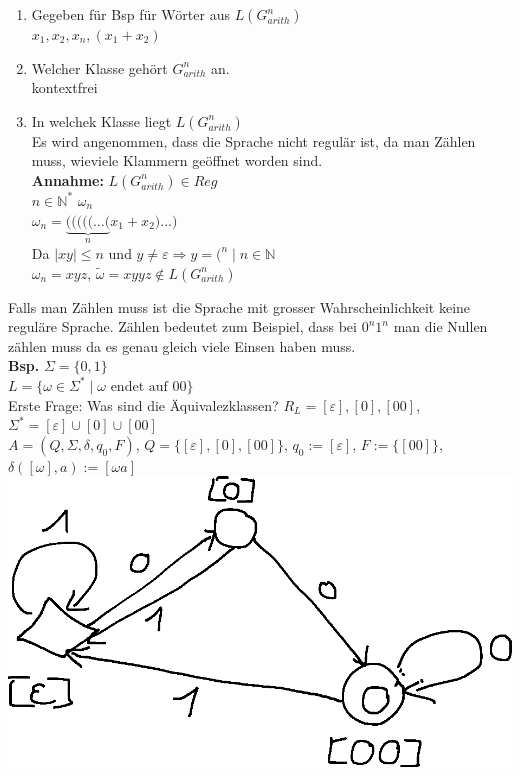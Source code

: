 \documentclass[10pt]{article}
\newcommand{\NN}{\mathbb{N}} %
\newcommand{\Bold}[1]{\textbf{#1}} %
\newcommand{\T}[1]{\text{#1}} %
\newcommand{\Ra}{\Rightarrow}
\begin{document}
\begin{enumerate}
 \item Gegeben f\"ur Bsp f\"ur W\"orter aus $L(G^n_{arith})$\\
 $x_1,x_2,x_n,(x_1+x_2)$
 \item Welcher Klasse geh\"ort $G^n_{arith}$ an.\\
 kontextfrei
 \item In welchek Klasse liegt $L(G^n_{arith})$\\
 Es wird angenommen, dass die Sprache nicht regul\"ar ist, da man Z\"ahlen muss, wieviele Klammern ge\"offnet worden sind.\\
 \Bold{Annahme:} $L(G^n_{arith})\in Reg$\\
 $n\in \NN^*$ $\omega_n$\\
 $\omega_n = \underbrace{(((((\dots(}_nx_1+x_2)\dots)$\\
 Da $\mid xy\mid\leq n$ und $y\neq\varepsilon\Ra y=(^n\mid n\in\NN$\\
 $\omega_n=xyz$, $\tilde{\omega}=xyyz\notin L(G^n_{arith})$
\end{enumerate}
Falls man Z\"ahlen muss ist die Sprache mit grosser Wahrscheinlichkeit keine regul\"are Sprache. Z\"ahlen bedeutet zum Beispiel, dass bei $0^n1^n$ man die Nullen z\"ahlen muss da es genau gleich viele Einsen haben muss.\\
\Bold{Bsp.} $\Sigma=\{0,1\}$\\
$L=\{\omega\in\Sigma^*\mid\omega\T{ endet auf }00\}$\\
Erste Frage: Was sind die \"Aquivalezklassen? $R_L=[\varepsilon],[0],[00]$, $\Sigma^*=[\varepsilon]\cup[0]\cup[00]$\\
$A=(Q,\Sigma,\delta,q_0,F)$, $Q=\{[\varepsilon],[0],[00]\}$, $q_0:=[\varepsilon]$, $F:=\{[00]\}$, $\delta([\omega],a):=[\omega a]$\\
\includegraphics{Bild17.eps}\\
\end{document}
